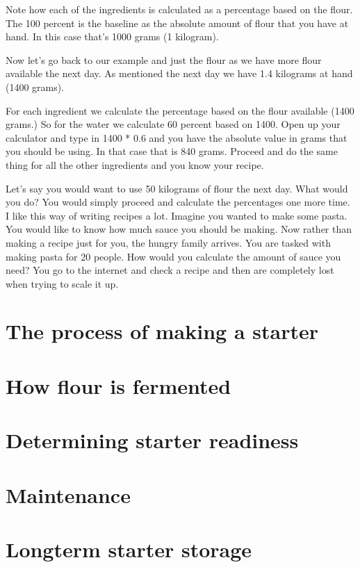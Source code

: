 Note how each of the ingredients is calculated as a percentage
based on the flour. The 100 percent is the baseline as the absolute
amount of flour that you have at hand. In this case that's 1000 grams
(1 kilogram).

Now let's go back to our example and just the flour as we have
more flour available the next day. As mentioned the next day
we have 1.4 kilograms at hand (1400 grams).

\begin{table}[H]
\centering
{}
\end{table}

For each ingredient we calculate the percentage 
based on the flour available (1400 grams.) So for the water
we calculate 60 percent based on 1400. Open up your
calculator and type in 1400 * 0.6 and you have
the absolute value in grams that you should be using.
In that case that is 840 grams. Proceed and do the same
thing for all the other ingredients and you know
your recipe. 

Let's say you would want to use 50 kilograms of flour 
the next day. What would you do? You would simply proceed
and calculate the percentages one more time. I like this
way of writing recipes a lot. Imagine you wanted to make
some pasta. You would like to know how much sauce you should
be making. Now rather than making a recipe just for you, the
hungry family arrives. You are tasked with making pasta
for 20 people. How would you calculate the amount of sauce
you need? You go to the internet and check a recipe and then
are completely lost when trying to scale it up.


\section{The process of making a starter}
\section{How flour is fermented}
\section{Determining starter readiness}
\section{Maintenance}
\section{Longterm starter storage}
